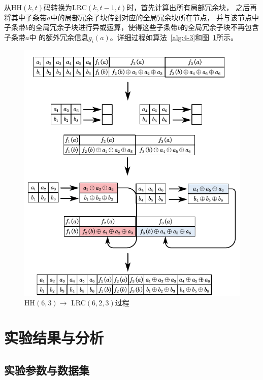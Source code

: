 


从HH$(k,t)$码转换为LRC$(k,t-1,t)$时，首先计算出所有局部冗余块，
之后再将其中子条带$a$中的局部冗余子块传到对应的全局冗余块所在节点， 
并与该节点中子条带$b$的全局冗余子块进行异或运算，使得这些子条带$b$的全局冗余子块不再包含子条带$a$中
的额外冗余信息$g_i(a)$。详细过程如算法~\ref{alg:4-3}和图~\ref{fig:4.5}所示。




\begin{figure}[htbp]
	\centering
	\includegraphics [scale=1.2]{figures/4.5.pdf}
	\caption{HH$(6,3) \rightarrow $ LRC$(6,2,3) $过程}
	\label{fig:4.5}
\end{figure}

\section{实验结果与分析}

\subsection{实验参数与数据集}

